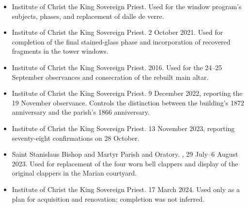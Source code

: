 \begin{itemize}[leftmargin=1.35em,itemsep=0.2em,topsep=0.2em]
\item Institute of Christ the King Sovereign Priest.  Used for the window program's subjects, phases, and replacement of dalle de verre.
\item Institute of Christ the King Sovereign Priest.  2 October 2021. Used for completion of the final stained-glass phase and incorporation of recovered fragments in the tower windows.
\item Institute of Christ the King Sovereign Priest.  2016. Used for the 24--25 September observances and consecration of the rebuilt main altar.
\item Institute of Christ the King Sovereign Priest.  9 December 2022, reporting the 19 November observance. Controls the distinction between the building's 1872 anniversary and the parish's 1866 anniversary.
\item Institute of Christ the King Sovereign Priest.  13 November 2023, reporting seventy-eight confirmations on 28 October.
\item Saint Stanislaus Bishop and Martyr Parish and Oratory. , 29 July--6 August 2023. Used for replacement of the four worn bell clappers and display of the original clappers in the Marian courtyard.
\item Institute of Christ the King Sovereign Priest.  17 March 2024. Used only as a plan for acquisition and renovation; completion was not inferred.

\end{itemize}
